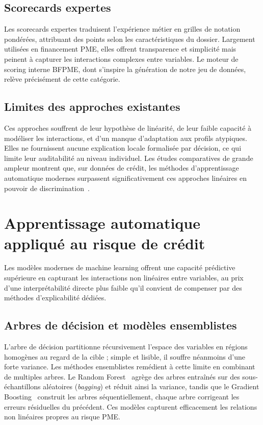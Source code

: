 \documentclass[a4paper,12pt,oneside]{report}
\begin{document}
\subsection{Scorecards expertes}

Les scorecards expertes traduisent l'expérience métier en grilles de notation pondérées,
attribuant des points selon les caractéristiques du dossier. Largement utilisées en
financement PME, elles offrent transparence et simplicité mais peinent à capturer les
interactions complexes entre variables. Le moteur de scoring interne BFPME, dont s'inspire la
génération de notre jeu de données, relève précisément de cette catégorie.

\subsection{Limites des approches existantes}

Ces approches souffrent de leur hypothèse de linéarité, de leur faible capacité à modéliser
les interactions, et d'un manque d'adaptation aux profils atypiques. Elles ne fournissent
aucune explication locale formalisée par décision, ce qui limite leur auditabilité au niveau
individuel. Les études comparatives de grande ampleur montrent que, sur données de crédit, les
méthodes d'apprentissage automatique modernes surpassent significativement ces approches
linéaires en pouvoir de discrimination~\cite{lessmann2015}.

\section{Apprentissage automatique appliqué au risque de crédit}

Les modèles modernes de machine learning offrent une capacité prédictive supérieure en
capturant les interactions non linéaires entre variables, au prix d'une interprétabilité
directe plus faible qu'il convient de compenser par des méthodes d'explicabilité dédiées.

\subsection{Arbres de décision et modèles ensemblistes}

L'arbre de décision partitionne récursivement l'espace des variables en régions homogènes
au regard de la cible ; simple et lisible, il souffre néanmoins d'une forte variance. Les
méthodes ensemblistes remédient à cette limite en combinant de multiples arbres. Le Random
Forest~\cite{breiman2001} agrège des arbres entraînés sur des sous-échantillons aléatoires
(\textit{bagging}) et réduit ainsi la variance, tandis que le Gradient
Boosting~\cite{friedman2001} construit les arbres séquentiellement, chaque arbre corrigeant les
erreurs résiduelles du précédent. Ces modèles capturent efficacement les relations non
linéaires propres au risque PME.
\end{document}
